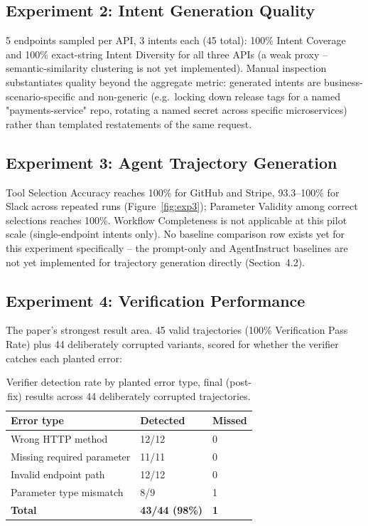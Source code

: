 \documentclass[letterpaper]{article} %
\begin{document}
\subsection{Experiment 2: Intent Generation Quality}
5 endpoints sampled per API, 3 intents each (45 total): 100\% Intent Coverage and 100\%
exact-string Intent Diversity for all three APIs (a weak proxy -- semantic-similarity clustering
is not yet implemented). Manual inspection substantiates quality beyond the aggregate metric:
generated intents are business-scenario-specific and non-generic (e.g.\ locking down release tags
for a named "payments-service" repo, rotating a named secret across specific microservices) rather
than templated restatements of the same request.

\subsection{Experiment 3: Agent Trajectory Generation}
Tool Selection Accuracy reaches 100\% for GitHub and Stripe, 93.3--100\% for Slack across repeated
runs (Figure~\ref{fig:exp3}); Parameter Validity among correct selections reaches 100\%. Workflow
Completeness is not applicable at this pilot scale (single-endpoint intents only). No baseline
comparison row exists yet for this experiment specifically -- the prompt-only and AgentInstruct
baselines are not yet implemented for trajectory generation directly (Section~4.2).

\subsection{Experiment 4: Verification Performance}
The paper's strongest result area. 45 valid trajectories (100\% Verification Pass Rate) plus 44
deliberately corrupted variants, scored for whether the verifier catches each planted error:

\begin{table}[htbp]
\centering
\caption{Verifier detection rate by planted error type, final (post-fix) results across 44
deliberately corrupted trajectories.}
\label{tab:verifier-detection}
\begin{tabular}{lll}
\toprule
\textbf{Error type} & \textbf{Detected} & \textbf{Missed} \\
\midrule
Wrong HTTP method & 12/12 & 0 \\
Missing required parameter & 11/11 & 0 \\
Invalid endpoint path & 12/12 & 0 \\
Parameter type mismatch & 8/9 & 1 \\
\midrule
\textbf{Total} & \textbf{43/44 (98\%)} & \textbf{1} \\
\bottomrule
\end{tabular}
\end{table}
\end{document}
